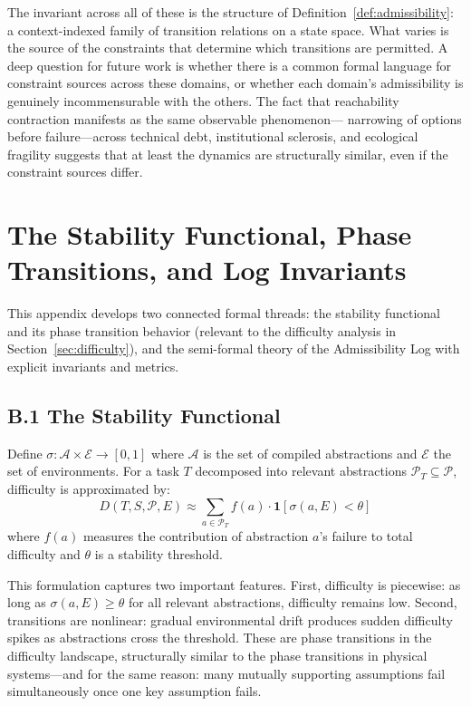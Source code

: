 \documentclass[12pt, a4paper]{article}
\theoremstyle{plain}
\theoremstyle{definition}
\theoremstyle{remark}
\begin{document}
The invariant across all of these is the structure of Definition~\ref{def:admissibility}:
a context-indexed family of transition relations on a state space. What varies
is the source of the constraints that determine which transitions are permitted.
A deep question for future work is whether there is a common formal language
for constraint sources across these domains, or whether each domain's
admissibility is genuinely incommensurable with the others. The fact that
reachability contraction manifests as the same observable phenomenon---
narrowing of options before failure---across technical debt, institutional
sclerosis, and ecological fragility suggests that at least the dynamics are
structurally similar, even if the constraint sources differ.

\section{The Stability Functional, Phase Transitions, and Log Invariants}
\label{app:stability}

This appendix develops two connected formal threads: the stability functional
and its phase transition behavior (relevant to the difficulty analysis in
Section~\ref{sec:difficulty}), and the semi-formal theory of the Admissibility
Log with explicit invariants and metrics.

\subsection*{B.1 The Stability Functional}

Define $\sigma: \mathcal{A} \times \mathcal{E} \to [0, 1]$ where $\mathcal{A}$
is the set of compiled abstractions and $\mathcal{E}$ the set of environments.
For a task $T$ decomposed into relevant abstractions $\mathcal{P}_T \subseteq
\mathcal{P}$, difficulty is approximated by:
$$D(T, S, \mathcal{P}, E) \approx \sum_{a \in \mathcal{P}_T} f(a) \cdot
\mathbf{1}[\sigma(a, E) < \theta]$$
where $f(a)$ measures the contribution of abstraction $a$'s failure to
total difficulty and $\theta$ is a stability threshold.

This formulation captures two important features. First, difficulty is
piecewise: as long as $\sigma(a,E) \geq \theta$ for all relevant abstractions,
difficulty remains low. Second, transitions are nonlinear: gradual environmental
drift produces sudden difficulty spikes as abstractions cross the threshold.
These are phase transitions in the difficulty landscape, structurally similar
to the phase transitions in physical systems---and for the same reason:
many mutually supporting assumptions fail simultaneously once one key
assumption fails.
\end{document}
